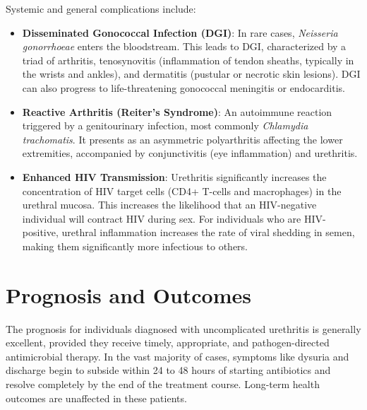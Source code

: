 Systemic and general complications include:
\begin{itemize}
    \item \textbf{Disseminated Gonococcal Infection (DGI)}: In rare cases, \textit{Neisseria gonorrhoeae} enters the bloodstream. This leads to DGI, characterized by a triad of arthritis, tenosynovitis (inflammation of tendon sheaths, typically in the wrists and ankles), and dermatitis (pustular or necrotic skin lesions). DGI can also progress to life-threatening gonococcal meningitis or endocarditis.

    \item \textbf{Reactive Arthritis (Reiter's Syndrome)}: An autoimmune reaction triggered by a genitourinary infection, most commonly \textit{Chlamydia trachomatis}. It presents as an asymmetric polyarthritis affecting the lower extremities, accompanied by conjunctivitis (eye inflammation) and urethritis.

    \item \textbf{Enhanced HIV Transmission}: Urethritis significantly increases the concentration of HIV target cells (CD4+ T-cells and macrophages) in the urethral mucosa. This increases the likelihood that an HIV-negative individual will contract HIV during sex. For individuals who are HIV-positive, urethral inflammation increases the rate of viral shedding in semen, making them significantly more infectious to others.
\end{itemize}

\section*{Prognosis and Outcomes}
The prognosis for individuals diagnosed with uncomplicated urethritis is generally excellent, provided they receive timely, appropriate, and pathogen-directed antimicrobial therapy. In the vast majority of cases, symptoms like dysuria and discharge begin to subside within 24 to 48 hours of starting antibiotics and resolve completely by the end of the treatment course. Long-term health outcomes are unaffected in these patients.

